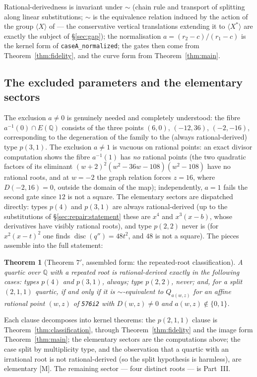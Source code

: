 \documentclass[11pt]{amsart}
\newtheorem{theorem}{Theorem}[section]
\newcommand{\Q}{\mathbb{Q}}
\begin{document}
Rational-derivedness is invariant under $\sim$ (chain rule and
transport of splitting along linear substitutions; $\sim$ is the
equivalence relation induced by the action of the group
$\langle X\rangle$ of \cite{BM2000} --- the conservative vertical
translations extending it to $\langle X^{*}\rangle$ are exactly the
subject of \S\ref{sec:gap}); the
normalisation $a=(r_{2}-c)/(r_{1}-c)$ is the kernel form of
\texttt{caseA\_normalized}; the gates then come from
Theorem~\ref{thm:fidelity}, and the curve form from
Theorem~\ref{thm:main}.

\subsection{The excluded parameters and the elementary sectors}
\label{sec:fidelity:excluded}

The exclusion $a \neq 0$ is genuinely needed and completely understood:
the fibre $a^{-1}(0) \cap E(\Q)$ consists of the three points $(6,0)$,
$(-12,36)$, $(-2,-16)$, corresponding to the degeneration of the family
to the (always rational-derived) type $p(3,1)$.  The exclusion
$a \neq 1$ is vacuous on rational points: an exact divisor computation
shows the fibre $a^{-1}(1)$ has \emph{no} rational points (the two
quadratic factors of its eliminant $(w+2)^2(w^2-36w-108)(w^2-108)$ have
no rational roots, and at $w=-2$ the graph relation forces $z=16$,
where $D(-2,16)=0$, outside the domain of the map); independently,
$a=1$ fails the second gate since $12$ is not a square.  The elementary
sectors are dispatched directly: types $p(4)$ and $p(3,1)$ are always
rational-derived (up to the substitutions of
\S\ref{sec:repair:statement} these are $x^{4}$ and $x^{3}(x-b)$, whose
derivatives have visibly rational roots), and type $p(2,2)$ never is
(for $x^2(x-t)^2$ one finds $\operatorname{disc}(q'') = 48t^{2}$, and
$48$ is not a square).  The pieces assemble into the full statement:

\begin{theorem}[Theorem $7'$, assembled form: the repeated-root
classification]\label{thm:assembled}
A quartic over $\Q$ with a repeated root is rational-derived exactly in
the following cases: types $p(4)$ and $p(3,1)$, always; type $p(2,2)$,
never; and, for a split $(2,1,1)$ quartic, if and only if it is
$\sim$-equivalent to $Q_{a(w,z)}$ for an affine rational point $(w,z)$
of \texttt{576i2} with $D(w,z)\neq0$ and $a(w,z)\notin\{0,1\}$.
\end{theorem}

\noindent Each clause decomposes into kernel theorems: the $p(2,1,1)$
clause is Theorem~\ref{thm:classification}, through
Theorem~\ref{thm:fidelity} and the image form Theorem~\ref{thm:main};
the elementary sectors are the computations above; the case split by
multiplicity type, and the observation that a quartic with an
irrational root is not rational-derived (so the split hypothesis is
harmless), are elementary [M].  The remaining sector --- four distinct
roots --- is Part~III.
\end{document}
